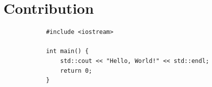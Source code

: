 \documentclass[12pt]{article}
\begin{document}
\section{Contribution}

        \begin{verbatim}
            #include <iostream>

            int main() {
                std::cout << "Hello, World!" << std::endl;
                return 0;
            }
        \end{verbatim}
\end{document}
